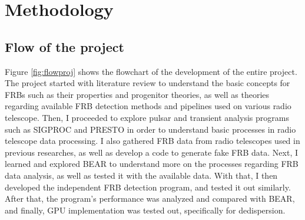 \chapter{Methodology}\label{method}

\section{Flow of the project}

Figure \ref{fig:flowproj} shows the flowchart of the development of the entire project. The project started with literature review to understand the basic concepts for FRBs such as their properties and progenitor theories, as well as theories regarding available FRB detection methods and pipelines used on various radio telescope. Then, I proceeded to explore pulsar and transient analysis programs such as SIGPROC and PRESTO in order to understand basic processes in radio telescope data processing. I also gathered FRB data from radio telescopes used in previous researches, as well as develop a code to generate fake FRB data. Next, I learned and explored BEAR to understand more on the processes regarding FRB data analysis, as well as tested it with the available data. With that, I then developed the independent FRB detection program, and tested it out similarly. After that, the program's performance was analyzed and compared with BEAR, and finally, GPU implementation was tested out, specifically for dedispersion.


